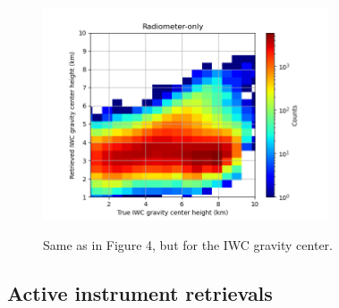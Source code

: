 \documentclass{ametsocV6.1}
\begin{document}
\begin{figure}[t]
    \centering
    \includegraphics[width=0.75\textwidth,angle=0]{./Figs/fig06.rev.png}\\
    \caption{Same as in Figure 4, but for the IWC gravity center.}\label{f6}
\end{figure}

\subsection{Active instrument retrievals}
\end{document}

